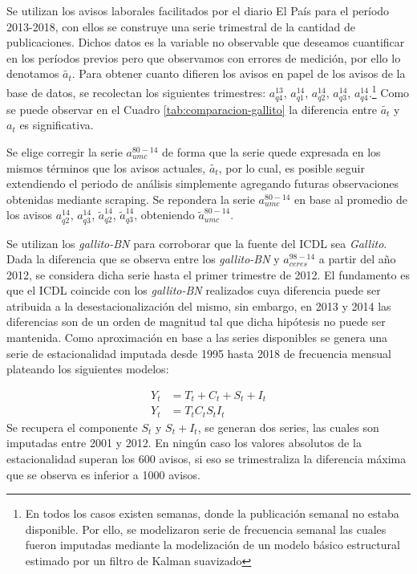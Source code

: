 \documentclass[12pt,oneside]{reedthesis}
\begin{document}
Se utilizan los avisos laborales facilitados por el diario El País para el período 2013-2018, con ellos se construye una serie trimestral de la cantidad de publicaciones.
Dichos datos es la variable no observable que deseamos cuantificar en los períodos previos pero que observamos con errores de medición, por ello lo denotamos \(\tilde{a_t}\). Para obtener cuanto difieren los avisos en papel de los avisos de la base de datos, se recolectan los siguientes trimestres: \(a_{q4}^{13}\), \(a_{q1}^{14}\), \(a_{q2}^{14}\), \(a_{q3}^{14}\), \(a_{q4}^{14}\).\footnote{En todos los casos existen semanas, donde la publicación semanal no estaba disponible. Por ello, se modelizaron serie de frecuencia semanal las cuales fueron imputadas mediante la modelización de un modelo básico estructural estimado por un filtro de Kalman suavizado} Como se puede observar en el Cuadro \ref{tab:comparacion-gallito} la diferencia entre \(\tilde{a_t}\) y \({a_t}\) es significativa.

Se elige corregir la serie \(a_{umc}^{80-14}\) de forma que la serie quede expresada en los mismos términos que los avisos actuales, \(\tilde{a_t}\), por lo cual, es posible seguir extendiendo el periodo de análisis simplemente agregando futuras observaciones obtenidas mediante scraping. Se repondera la serie \(a_{umc}^{80-14}\) en base al promedio de los avisos \(a_{q2}^{14}\), \(a_{q3}^{14}\), \(\tilde{a}_{q2}^{14}\), \(\tilde{a}_{q3}^{14}\), obteniendo \(\tilde{a}_{umc}^{80-14}\).

Se utilizan los \emph{gallito-BN} para corroborar que la fuente del ICDL sea \emph{Gallito}.
Dada la diferencia que se observa entre los \emph{gallito-BN} y \(a_{ceres}^{98-14}\) a partir del año 2012, se considera dicha serie hasta el primer trimestre de 2012. El fundamento es que el ICDL coincide con los \emph{gallito-BN} realizados cuya diferencia puede ser atribuida a la desestacionalización del mismo, sin embargo, en 2013 y 2014 las diferencias son de un orden de magnitud tal que dicha hipótesis no puede ser mantenida.
Como aproximación en base a las series disponibles se genera una serie de estacionalidad imputada desde 1995 hasta 2018 de frecuencia mensual plateando los siguientes modelos:

\[
\begin{aligned}
Y_t &= T_t + C_t + S_t + I_t \\
Y_t &= T_t C_t S_t I_t
\end{aligned}
\]
Se recupera el componente \(S_t\) y \(S_t + I_t\), se generan dos series, las cuales son imputadas entre 2001 y 2012. En ningún caso los valores absolutos de la estacionalidad superan los 600 avisos, si eso se trimestraliza la diferencia máxima que se observa es inferior a 1000 avisos.
\end{document}
